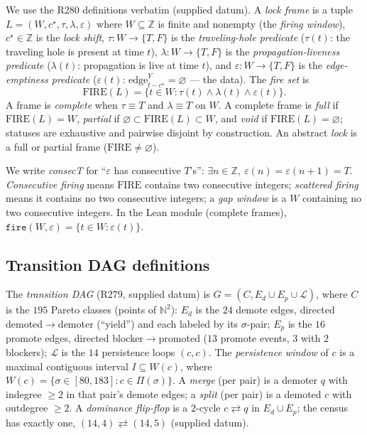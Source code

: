 \documentclass[11pt,a4paper]{article}
\theoremstyle{definition}
\begin{document}
We use the R280 definitions verbatim (supplied datum). A \emph{lock
frame} is a tuple $L=(W,c^\star,\tau,\lambda,\varepsilon)$ where
$W\subseteq\mathbb{Z}$ is finite and nonempty (the \emph{firing
window}), $c^\star\in\mathbb{Z}$ is the \emph{lock shift},
$\tau:W\to\{T,F\}$ is the \emph{traveling-hole predicate}
($\tau(t)$: the traveling hole is present at time $t$),
$\lambda:W\to\{T,F\}$ is the \emph{propagation-liveness predicate}
($\lambda(t)$: propagation is live at time $t$), and
$\varepsilon:W\to\{T,F\}$ is the \emph{edge-emptiness predicate}
($\varepsilon(t)$: $\mathrm{edge}_{t-c^\star}^Y=\varnothing$ --- the
data). The \emph{fire set} is
\begin{equation}
  \label{eq:fire}
  \mathrm{FIRE}(L)=\{t\in W:\tau(t)\land\lambda(t)\land\varepsilon(t)\}.
\end{equation}
A frame is \emph{complete} when $\tau\equiv T$ and $\lambda\equiv T$ on
$W$. A complete frame is \emph{full} if $\mathrm{FIRE}(L)=W$,
\emph{partial} if $\varnothing\subset\mathrm{FIRE}(L)\subset W$, and
\emph{void} if $\mathrm{FIRE}(L)=\varnothing$; statuses are exhaustive
and pairwise disjoint by construction. An abstract \emph{lock} is a full
or partial frame ($\mathrm{FIRE}\neq\varnothing$).

We write \emph{consecT} for ``$\varepsilon$ has consecutive $T$'s'':
$\exists n\in\mathbb{Z},\ \varepsilon(n)=\varepsilon(n+1)=T$.
\emph{Consecutive firing} means $\mathrm{FIRE}$ contains two
consecutive integers; \emph{scattered firing} means it contains no two
consecutive integers; a \emph{gap window} is a $W$ containing no two
consecutive integers. In the Lean module (complete frames),
$\mathtt{fire}(W,\varepsilon)=\{t\in W:\varepsilon(t)\}$.

\subsection{Transition DAG definitions}

The \emph{transition DAG} (R279, supplied datum) is
$G=(C,E_d\cup E_p\cup\mathcal{L})$, where $C$ is the $195$ Pareto
classes (points of $\mathbb{N}^2$): $E_d$ is the $24$ demote edges,
directed demoted$\to$demoter (``yield'') and each labeled by its
$\sigma$-pair; $E_p$ is the $16$ promote edges, directed
blocker$\to$promoted ($13$ promote events, $3$ with $2$ blockers);
$\mathcal{L}$ is the $14$ persistence loops $(c,c)$. The \emph{persistence
window} of $c$ is a maximal contiguous interval $I\subseteq W(c)$,
where $W(c)=\{\sigma\in[80,183]:c\in\Pi(\sigma)\}$. A \emph{merge} (per
pair) is a demoter $q$ with indegree $\ge2$ in that pair's demote edges;
a \emph{split} (per pair) is a demoted $c$ with outdegree $\ge2$. A
\emph{dominance flip-flop} is a $2$-cycle $c\rightleftarrows q$ in
$E_d\cup E_p$; the census has exactly one, $(14,4)\rightleftarrows
(14,5)$ (supplied datum).
\end{document}
